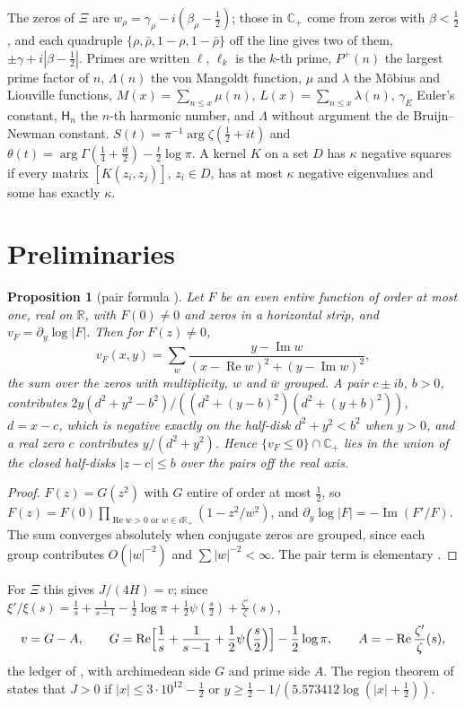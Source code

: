 \documentclass[11pt]{article}
\newtheorem{proposition}[theorem]{Proposition}
\theoremstyle{definition}\newtheorem{definition}[theorem]{Definition}
\theoremstyle{remark}\newtheorem{remark}[theorem]{Remark}
\newcommand{\R}{\mathbb R}\newcommand{\C}{\mathbb C}\newcommand{\N}{\mathbb N}
\renewcommand{\Re}{\operatorname{Re}}\renewcommand{\Im}{\operatorname{Im}}
\begin{document}
The zeros of $\Xi$ are $w_\rho=\gamma_\rho-i(\beta_\rho-\frac12)$; those in $\C_+$ come from zeros with $\beta<\frac12$, and each quadruple $\{\rho,\bar\rho,1-\rho,1-\bar\rho\}$ off the line gives two of them, $\pm\gamma+i|\beta-\frac12|$. Primes are written $\ell$, $\ell_k$ is the $k$-th prime, $P^+(n)$ the largest prime factor of $n$, $\Lambda(n)$ the von Mangoldt function, $\mu$ and $\lambda$ the M\"obius and Liouville functions, $M(x)=\sum_{n\le x}\mu(n)$, $L(x)=\sum_{n\le x}\lambda(n)$, $\gamma_E$ Euler's constant, $\mathsf H_n$ the $n$-th harmonic number, and $\Lambda$ without argument the de Bruijn--Newman constant. $S(t)=\pi^{-1}\arg\zeta(\frac12+it)$ and $\theta(t)=\arg\Gamma(\frac14+\frac{it}2)-\frac t2\log\pi$. A kernel $K$ on a set $D$ has $\kappa$ negative squares if every matrix $[K(z_i,z_j)]$, $z_i\in D$, has at most $\kappa$ negative eigenvalues and some has exactly $\kappa$.

\section{Preliminaries}\label{sec:prelim}

\begin{proposition}[pair formula {\cite[Prop.~10.1]{S01}}]\label{prop:pair}
Let $F$ be an even entire function of order at most one, real on $\R$, with $F(0)\ne0$ and zeros in a horizontal strip, and $v_F=\partial_y\log|F|$. Then for $F(z)\ne0$,
\[
v_F(x,y)=\sum_w\frac{y-\Im w}{(x-\Re w)^2+(y-\Im w)^2},
\]
the sum over the zeros with multiplicity, $w$ and $\bar w$ grouped. A pair $c\pm ib$, $b>0$, contributes $2y(d^2+y^2-b^2)/((d^2+(y-b)^2)(d^2+(y+b)^2))$, $d=x-c$, which is negative exactly on the half-disk $d^2+y^2<b^2$ when $y>0$, and a real zero $c$ contributes $y/(d^2+y^2)$. Hence $\{v_F\le0\}\cap\C_+$ lies in the union of the closed half-disks $|z-c|\le b$ over the pairs off the real axis.
\end{proposition}
\begin{proof}
$F(z)=G(z^2)$ with $G$ entire of order at most $\frac12$, so $F(z)=F(0)\prod_{\Re w>0\text{ or }w\in i\R_+}(1-z^2/w^2)$, and $\partial_y\log|F|=-\Im(F'/F)$. The sum converges absolutely when conjugate zeros are grouped, since each group contributes $O(|w|^{-2})$ and $\sum|w|^{-2}<\infty$. The pair term is elementary \cite{S01}.
\end{proof}

For $\Xi$ this gives $J/(4H)=v$; since $\xi'/\xi(s)=\frac1s+\frac1{s-1}-\frac12\log\pi+\frac12\psi(\frac s2)+\frac{\zeta'}\zeta(s)$,
\begin{equation}\label{eq:ledger}
v=G-A,\qquad G=\Re\Bigl[\frac1s+\frac1{s-1}+\frac12\psi\Bigl(\frac s2\Bigr)\Bigr]-\frac12\log\pi,\qquad A=-\Re\frac{\zeta'}\zeta(s),
\end{equation}
the ledger of \cite{S01}, with archimedean side $G$ and prime side $A$. The region theorem of \cite{S01} states that $J>0$ if $|x|\le3\cdot10^{12}-\frac12$ or $y\ge\frac12-1/(5.573412\log(|x|+\frac12))$.
\end{document}
